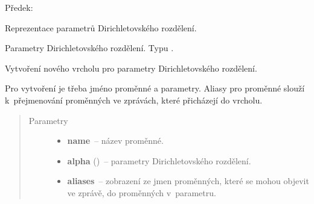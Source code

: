\begin{fulllineitems}
\label{alex.infer:alex.infer.factor.alex.infer.node.DirichletParameterNode}
Předek: {\hyperref[alex.infer:alex.infer.factor.alex.infer.node.VariableNode]{}}

Reprezentace parametrů Dirichletovského rozdělení.

\begin{fulllineitems}
\label{alex.infer:alex.infer.factor.alex.infer.node.DirichletParameterNode.alpha}
Parametry Dirichletovského rozdělení. Typu {\hyperref[alex.infer:alex.infer.factor.Factor]{}}.

\end{fulllineitems}


\begin{fulllineitems}
\label{alex.infer:alex.infer.factor.alex.infer.node.DirichletParameterNode.__init__}
Vytvoření nového vrcholu pro parametry Dirichletovského rozdělení.

Pro vytvoření je třeba jméno proměnné a parametry.
Aliasy pro proměnné slouží k~přejmenování proměnných ve zprávách, které
přicházejí do vrcholu.
\begin{quote}\begin{description}
\item[{Parametry}] \leavevmode\begin{itemize}
\item {} 
\textbf{name}~-- název proměnné.

\item {} 
\textbf{alpha} ({\hyperref[alex.infer:alex.infer.factor.Factor]{}})~-- parametry Dirichletovského rozdělení.

\item {} 
\textbf{aliases}~-- zobrazení ze jmen proměnných, které se mohou objevit ve zprávě, do proměnných v~parametru.

\end{itemize}

\end{description}\end{quote}


\end{fulllineitems}
\end{fulllineitems}
